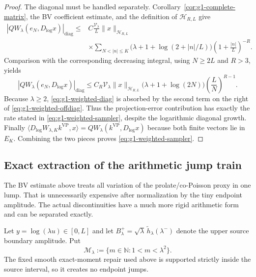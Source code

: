 \documentclass[11pt]{article}
\theoremstyle{remark}
\begin{document}
\begin{proof}
The diagonal must be handled separately.  Corollary~\ref{cor:g1-complete-matrix},
the BV coefficient estimate, and the definition of $\mathcal H_{R,L}$ give
\[
 \begin{split}
 |QW_\lambda(e_N,D_{\log}x)|_{\mathrm{diag}}
 \le{}& C\frac{\mathcal V_\lambda}{L}
 \|x\|_{\mathcal H_{R,L}}\\
 &\times\sum_{N<|n|\le K}
 \bigl(\lambda+1+\log(2+|n|/L)\bigr)
 \left(1+\frac{|n|}{L}\right)^{-R}.
 \end{split}
\]
Comparison with the corresponding decreasing integral, using $N\ge2L$ and
$R>3$, yields
\begin{equation}\label{eq:g1-weighted-diag}
 |QW_\lambda(e_N,D_{\log}x)|_{\mathrm{diag}}
 \le C_R\mathcal V_\lambda\|x\|_{\mathcal H_{R,L}}
 \bigl(\lambda+1+\log(2N)\bigr)
 \left(\frac{L}{N}\right)^{R-1}.
\end{equation}
Because $\lambda\ge2$, \eqref{eq:g1-weighted-diag} is absorbed by the
second term on the right of \eqref{eq:g1-weighted-offdiag}.  Thus the
projection-error contribution has exactly the rate stated in
\eqref{eq:g1-weighted-sampler}, despite the logarithmic diagonal growth.
Finally
$\langle D_{\log}W_{\lambda,K}k^{\mathrm{VP}},x\rangle
=QW_\lambda(k^{\mathrm{VP}},D_{\log}x)$ because both finite vectors lie in
$E_K$.  Combining the two pieces proves \eqref{eq:g1-weighted-sampler}.
\end{proof}

\subsection*{Exact extraction of the arithmetic jump train}
The BV estimate above treats all variation of the prolate/co-Poisson proxy in
one lump.  That is unnecessarily expensive after normalization by the tiny
endpoint amplitude.  The actual discontinuities have a much more rigid
arithmetic form and can be separated exactly.

Let $y=\log(\lambda u)\in[0,L]$ and let $B_\lambda^{+}
=\sqrt\lambda\,\widetilde h_\lambda(\lambda^-)$ denote the upper source
boundary amplitude.  Put
\[
 \mathcal M_\lambda:=\{m\in\mathbb N:1<m<\lambda^2\}.
\]
The fixed smooth exact-moment repair used above is supported strictly inside
the source interval, so it creates no endpoint jumps.
\end{document}
